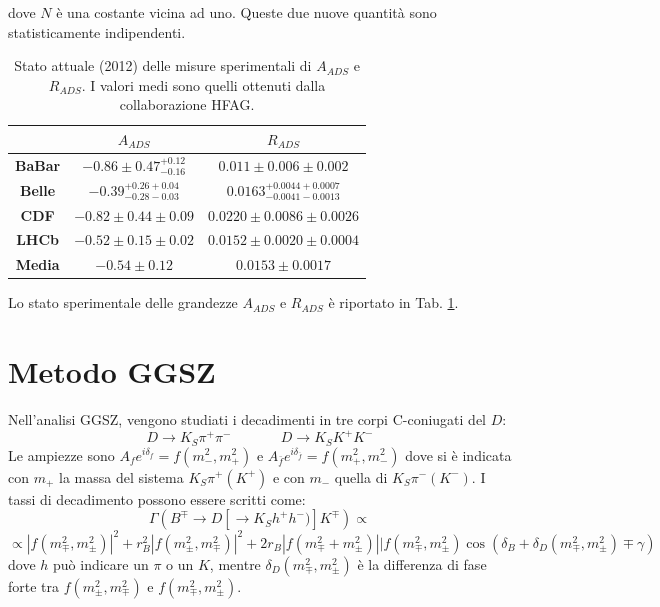 dove $N$ è una costante vicina ad uno. Queste due nuove quantità sono statisticamente indipendenti.
\begin{table}
\begin{center}
\begin{tabular}{|c|c|c|}\hline
 & \textbf{$A_{ADS}$} & \textbf{$R_{ADS}$}\\\hline
\textbf{BaBar} & $-0.86 \pm 0.47_{-0.16}^{+0.12}$ & $0.011 \pm 0.006 \pm 0.002$\\\hline
\textbf{Belle} & $-0.39_{-0.28 -0.03}^{+0.26 +0.04}$ & $0.0163_{- 0.0041 - 0.0013}^{+0.0044 + 0.0007}$\\\hline
\textbf{CDF} & $-0.82 \pm 0.44 \pm 0.09$ & $0.0220 \pm 0.0086 \pm 0.0026$\\\hline
\textbf{LHCb} & $-0.52 \pm 0.15 \pm 0.02$ & $0.0152 \pm 0.0020 \pm 0.0004$\\\hline
\textbf{Media} & $-0.54 \pm 0.12$ & $0.0153 \pm 0.0017$\\\hline
\end{tabular}
\end{center}
\caption{Stato attuale (2012) delle misure sperimentali di $A_{ADS}$ e $R_{ADS}$. I valori medi sono quelli ottenuti dalla collaborazione
         HFAG\cite{HFAG}.}
\label{referenzatabella}
\end{table}
Lo stato sperimentale delle grandezze $A_{ADS}$ e $R_{ADS}$ è riportato in Tab. \ref{referenzatabella}. 


\section{Metodo GGSZ}
\noindent
Nell'analisi GGSZ, vengono studiati i decadimenti in tre corpi C-coniugati del $D$:
\begin{equation}\label{decadimento}
 D \rightarrow K_S\pi^+\pi^- \ \ \ \ \ \ \ \ \ \ \ \ \ \ \ \ D \rightarrow K_SK^+K^-
\end{equation}
Le ampiezze sono $A_fe^{i\delta_f} = f(m_-^2, m_+^2)$ e $A_{\bar{f}}e^{i\delta_{\bar{f}}} = f(m_+^2, m_-^2)$
dove si è indicata con $m_+$ la massa del sistema $K_S\pi^+(K^+)$ e con $m_-$ quella di $K_S\pi^-(K^-)$.
I tassi di decadimento possono essere scritti come:
\begin{equation}\label{GGSZ}
 \Gamma(B^{\mp} \rightarrow D[\rightarrow K_Sh^+h^-)]K^{\mp}) \propto  
\end{equation}
\begin{equation*}
 \propto |f(m_{\mp}^2, m_{\pm}^2)|^2 + r_B^2|f(m_{\pm}^2, m_{\mp}^2)|^2 + 2r_B|f(m_{\mp}^2 + m_{\pm}^2)||f(m_{\mp}^2, m_{\pm}^2)\cos(\delta_B + \delta_D(m_{\mp}^2, m_{\pm}^2)\mp \gamma)
\end{equation*}
dove $h$ può indicare un $\pi$ o un $K$, mentre $\delta_D(m_{\mp}^2, m_{\pm}^2)$ è la differenza di fase forte tra $f(m_{\pm}^2, m_{\mp}^2)$ e $f(m_{\mp}^2, m_{\pm}^2)$.

